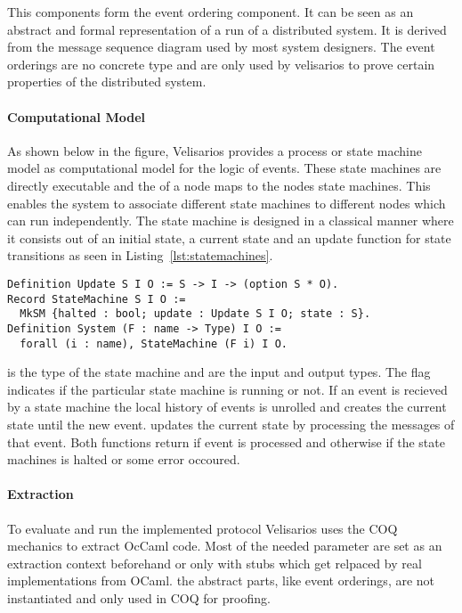This components form the event ordering component. It can be seen
as an abstract and formal representation of a run of a distributed system.
It is derived from the message sequence diagram used by most system designers.
The event orderings are no concrete type and are only used by velisarios
to prove certain properties of the distributed system.~\cite{rahli2018velisarios}

\paragraph{Computational Model}
As shown below in the figure, Velisarios provides a process or state machine
model as computational model for the logic of events. These state machines
are directly executable and the  of a node maps to the nodes
state machines. This enables the system to associate different state machines
to different nodes which can run independently.
The state machine is designed in a classical manner where
it consists out of an initial state, a current state and an update function
for state transitions as seen in Listing~\ref{lst:statemachines}.

\begin{lstlisting}[style=coq,float,label=lst:statemachines,caption=State
machine definition and update function.]
Definition Update S I O := S -> I -> (option S * O).
Record StateMachine S I O := 
  MkSM {halted : bool; update : Update S I O; state : S}.
Definition System (F : name -> Type) I O :=
  forall (i : name), StateMachine (F i) I O.
\end{lstlisting}

 is the type of the state machine and  are the input
and output types. The  flag indicates if the particular
state machine is running or not. If an event  is recieved by
a state machine the local history of events is unrolled and
 creates the current state until
the new event.  updates the current
state by processing the messages of that event. Both functions
return  if event is processed and otherwise
 if the state machines is halted or some error occoured.~\cite{rahli2018velisarios}

\paragraph{Extraction}
To evaluate and run the implemented protocol Velisarios
uses the COQ mechanics to extract OcCaml code. Most of
the needed parameter are set as an extraction context beforehand
or only with stubs which get relpaced by real implementations from
OCaml. the abstract parts, like event orderings, are not
instantiated and only used in COQ for proofing.~\cite{rahli2018velisarios}

